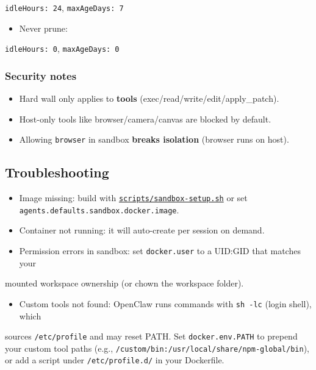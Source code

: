 \texttt{idleHours: 24}, \texttt{maxAgeDays: 7}
\begin{itemize}
  \item Never prune:
\end{itemize}

\texttt{idleHours: 0}, \texttt{maxAgeDays: 0}

\subsubsection{Security notes}


\begin{itemize}
  \item Hard wall only applies to \textbf{tools} (exec/read/write/edit/apply\_patch).
  \item Host-only tools like browser/camera/canvas are blocked by default.
  \item Allowing \texttt{browser} in sandbox \textbf{breaks isolation} (browser runs on host).
\end{itemize}


\subsection{Troubleshooting}


\begin{itemize}
  \item Image missing: build with \href{https://github.com/openclaw/openclaw/blob/main/scripts/sandbox-setup.sh}{\texttt{scripts/sandbox-setup.sh}} or set \texttt{agents.defaults.sandbox.docker.image}.
  \item Container not running: it will auto-create per session on demand.
  \item Permission errors in sandbox: set \texttt{docker.user} to a UID:GID that matches your
\end{itemize}

mounted workspace ownership (or chown the workspace folder).
\begin{itemize}
  \item Custom tools not found: OpenClaw runs commands with \texttt{sh -lc} (login shell), which
\end{itemize}

sources \texttt{/etc/profile} and may reset PATH. Set \texttt{docker.env.PATH} to prepend your
custom tool paths (e.g., \texttt{/custom/bin:/usr/local/share/npm-global/bin}), or add
a script under \texttt{/etc/profile.d/} in your Dockerfile.


